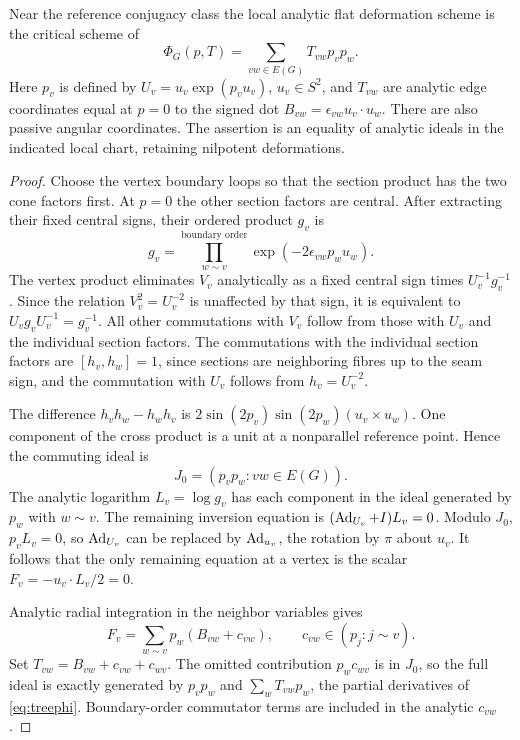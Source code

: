 \begin{theorem}\label{thm:flat}
Near the reference conjugacy class the local analytic flat deformation scheme is the critical scheme of
\begin{equation}\label{eq:treephi}
     \Phi_G(p,T)=\sum_{vw\in E(G)}T_{vw}p_vp_w.
\end{equation}
Here \(p_v\) is defined by \(U_v=u_v\exp(p_vu_v)\), \(u_v\in S^2\), and \(T_{vw}\) are analytic edge coordinates equal at \(p=0\) to the signed dot \(B_{vw}=\epsilon_{vw}u_v\cdot u_w\). There are also passive angular coordinates. The assertion is an equality of analytic ideals in the indicated local chart, retaining nilpotent deformations.
\end{theorem}
\begin{proof}
Choose the vertex boundary loops so that the section product has the two cone factors first. At \(p=0\) the other section factors are central. After extracting their fixed central signs, their ordered product \(g_v\) is
\[
        g_v=\prod_{w\sim v}^{\text{boundary order}}\exp(-2\epsilon_{vw}p_wu_w).
\]
The vertex product eliminates \(V_v\) analytically as a fixed central sign times \(U_v^{-1}g_v^{-1}\). Since the relation \(V_v^2=U_v^{-2}\) is unaffected by that sign, it is equivalent to \(U_vg_vU_v^{-1}=g_v^{-1}\). All other commutations with \(V_v\) follow from those with \(U_v\) and the individual section factors. The commutations with the individual section factors are \([h_v,h_w]=1\), since sections are neighboring fibres up to the seam sign, and the commutation with \(U_v\) follows from \(h_v=U_v^{-2}\).

The difference \(h_vh_w-h_wh_v\) is \(2\sin(2p_v)\sin(2p_w)(u_v\times u_w)\). One component of the cross product is a unit at a nonparallel reference point. Hence the commuting ideal is
\[
                  J_0=(p_vp_w:vw\in E(G)).
\]
The analytic logarithm \(L_v=\log g_v\) has each component in the ideal generated by \(p_w\) with \(w\sim v\). The remaining inversion equation is \((\operatorname{Ad}_{U_v}+I)L_v=0\). Modulo \(J_0\), \(p_v L_v=0\), so \(\operatorname{Ad}_{U_v}\) can be replaced by \(\operatorname{Ad}_{u_v}\), the rotation by \(\pi\) about \(u_v\). It follows that the only remaining equation at a vertex is the scalar \(F_v=-u_v\cdot L_v/2=0\).

Analytic radial integration in the neighbor variables gives
\[
 F_v=\sum_{w\sim v}p_w(B_{vw}+c_{vw}),\qquad
              c_{vw}\in(p_j:j\sim v).
\]
Set \(T_{vw}=B_{vw}+c_{vw}+c_{wv}\). The omitted contribution \(p_wc_{wv}\) is in \(J_0\), so the full ideal is exactly generated by \(p_vp_w\) and \(\sum_w T_{vw}p_w\), the partial derivatives of \eqref{eq:treephi}. Boundary-order commutator terms are included in the analytic \(c_{vw}\).


\end{proof}
